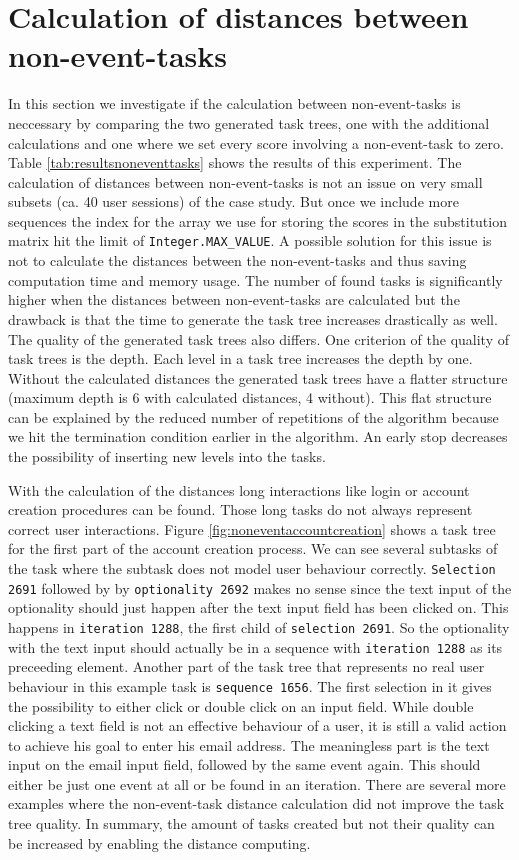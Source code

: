 \section{Calculation of distances between non-event-tasks}
\label{sec:noneventtasks}
In this section we investigate if the calculation between non-event-tasks is neccessary by comparing the two generated task trees, one with the additional calculations and one where
we set every score involving a non-event-task to zero. 
Table \ref{tab:resultsnoneventtasks} shows the results of this experiment.
The calculation of distances between non-event-tasks is not an issue on very small subsets (ca. 40 user sessions) of the case study. 
But once we include more sequences the index for the array we use for storing the scores in the substitution matrix hit the limit of \texttt{Integer.MAX\_VALUE}.
A possible solution for this issue is not to calculate the distances between the non-event-tasks and thus saving computation time and memory usage.
The number of found tasks is significantly higher when the distances between non-event-tasks are calculated but the drawback is that the time to generate the task tree increases drastically as well.
The quality of the generated task trees also differs.
One criterion of the quality of task trees is the depth. 
Each level in a task tree increases the depth by one.
Without the calculated distances the generated task trees have a flatter structure (maximum depth is 6 with calculated distances, 4 without).
This flat structure can be explained by the reduced number of repetitions of the algorithm because we hit the termination condition earlier in the algorithm.
An early stop decreases the possibility of inserting new levels into the tasks.

With the calculation of the distances long interactions like login or account creation procedures can be found.
Those long tasks do not always represent correct user interactions.
Figure \ref{fig:noneventaccountcreation} shows a task tree for the first part of the account creation process.
We can see several subtasks of the task where the subtask does not model user behaviour correctly.
\texttt{Selection 2691} followed by by \texttt{optionality 2692} makes no sense since the text input of the optionality should just happen after the text input field has been clicked on.
This happens in \texttt{iteration 1288}, the first child of \texttt{selection 2691}. So the optionality with the text input should actually be in a sequence with \texttt{iteration 1288} as its preceeding element.
Another part of the task tree that represents no real user behaviour in this example task is \texttt{sequence 1656}.
The first selection in it gives the possibility to either click or double click on an input field.
While double clicking a text field is not an effective behaviour of a user, it is still a valid action to achieve his goal to enter his email address.
The meaningless part is the text input on the email input field, followed by the same event again. This should either be just one event at all or be found in an iteration.
There are several more examples where the non-event-task distance calculation did not improve the task tree quality.
In summary, the amount of tasks created but not their quality can be increased by enabling the distance computing.

